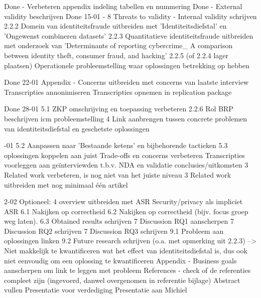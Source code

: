 Done - Verbeteren appendix indeling tabellen en nummering
Done - External validity beschrijven
Done 15-01 - 
8 Threats to validity - Internal validity schrijven
2.2.2 Domein van identiteitsfraude uitbreiden met 'Identiteitsdiefstal' en 'Ongewenst combineren datasets'
2.2.3 Quantitatieve identiteitsfraude uitbreiden met onderzoek van 'Determinants of reporting cybercrime_ A
comparison between identity theft, consumer fraud, and hacking'
2.2.5 (of 2.2.4 lager plaatsen) Operationele probleemstelling waar oplossingen betrekking op hebben

Done 22-01
Appendix - Concerns uitbreiden met concerns van laatste interview
Transcripties annonimiseren
Transcripties opnemen in replication package

Done 28-01
5.1 ZKP omschrijving en toepassing verbeteren
2.2.6 Rol BRP beschrijven icm probleemstelling
4 Link aanbrengen tussen concrete problemen van identiteitsdiefstal en geschetste oplossingen

-01
5.2 Aanpassen naar 'Bestaande ketens' en bijbehorende tactieken
5.3 oplossingen koppelen aan juist Trade-offs en concerns verbeteren
Transcripties voorleggen aan geïnterviewden t.b.v. NDA en validatie conclusies/uitkomsten
3 Related work verbeteren, is nog niet van het juiste niveau
3 Related work uitbreiden met nog minimaal één artikel

2-02
Optioneel: 4 overview uitbreiden met ASR Security/privacy als impliciet ASR
6.1 Nakijken op correctheid
6.2 Nakijken op correctheid (bijv. focus groep weg laten).
6.3 Obtained results schrijven
7 Discussion RQ1 aanscherpen
7 Discussion RQ2 schrijven
7 Discussion RQ3 schrijven
9.1 Probleem aan oplossingen linken
9.2 Future research schrijven (o.a. met opmerking uit 2.2.3)
--> Niet makkelijk te kwantificeren wat het effect van identiteitsdiefstal is, dus ook niet eenvoudig om een oplossing te kwantificeren
Appendix - Business goals aanscherpen om link te leggen met probleem
References - check of de referenties compleet zijn (ingevoerd, danwel overgenomen in referentie bijlage)
Abstract vullen
Presentatie voor verdediging
Presentatie aan Michiel